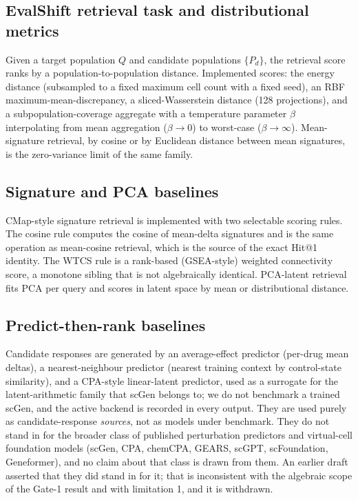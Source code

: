\documentclass[11pt,letterpaper]{article}
\begin{document}
\subsection*{EvalShift retrieval task and distributional metrics}

Given a target population $Q$ and candidate populations $\{P_d\}$, the retrieval score ranks by a
population-to-population distance. Implemented scores: the energy distance\cite{EnergyDistance} (subsampled to a fixed maximum cell
count with a fixed seed), an RBF maximum-mean-discrepancy\cite{MMD}, a
sliced-Wasserstein distance (128 projections)\cite{SlicedWasserstein}, and a
subpopulation-coverage aggregate with a temperature parameter $\beta$
interpolating from mean aggregation ($\beta \to 0$) to worst-case
($\beta \to \infty$). Mean-signature retrieval, by cosine or by Euclidean distance between
mean signatures, is the zero-variance limit of the same family.

\subsection*{Signature and PCA baselines}

CMap-style signature retrieval is implemented with two selectable scoring rules. The
cosine rule computes the cosine of mean-delta signatures and is the same operation as
mean-cosine retrieval, which is the source of the exact Hit@1 identity. The WTCS rule is a
rank-based (GSEA-style) weighted connectivity score, a monotone sibling that is not
algebraically identical. PCA-latent retrieval fits PCA per query and scores in latent space
by mean or distributional distance.

\subsection*{Predict-then-rank baselines}

Candidate responses are generated by an average-effect predictor (per-drug mean
deltas), a nearest-neighbour predictor (nearest training context by control-state
similarity), and a CPA-style linear-latent predictor, used as a surrogate for
the latent-arithmetic family that scGen\cite{ref4} belongs to; we do not benchmark a trained
scGen, and the active backend is recorded in every output. They are used purely as
candidate-response \emph{sources}, not as models under benchmark. They do not stand in
for the broader class of published perturbation predictors and virtual-cell foundation models
(scGen\cite{ref4}, CPA\cite{ref5}, chemCPA\cite{ref6}, GEARS\cite{ref10}, scGPT\cite{ref7},
scFoundation\cite{ref8}, Geneformer\cite{ref9}), and no claim about that class is drawn from
them. An earlier draft asserted that they did stand in for it; that is inconsistent with the
algebraic scope of the Gate-1 result and with limitation 1, and it is withdrawn.
\end{document}
